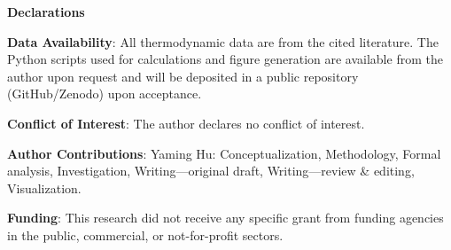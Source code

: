 \documentclass[sn-mathphys,Numbered]{sn-jnl}
\begin{document}
\noindent\textbf{Declarations}

\noindent\textbf{Data Availability}: All thermodynamic data are from the cited literature. The Python scripts used for calculations and figure generation are available from the author upon request and will be deposited in a public repository (GitHub/Zenodo) upon acceptance.

\noindent\textbf{Conflict of Interest}: The author declares no conflict of interest.

\noindent\textbf{Author Contributions}: Yaming Hu: Conceptualization, Methodology, Formal analysis, Investigation, Writing---original draft, Writing---review \& editing, Visualization.

\noindent\textbf{Funding}: This research did not receive any specific grant from funding agencies in the public, commercial, or not-for-profit sectors.


\end{document}
